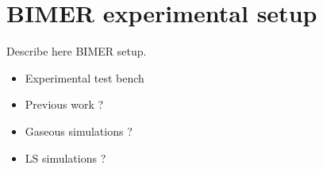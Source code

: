 \chapter{BIMER experimental setup}
	\label{ch:bimer_test_bench}


Describe here BIMER setup.

\begin{itemize}

	\item Experimental test bench
	
	\item Previous work ?
	
	\item Gaseous simulations ?
	
	\item LS simulations ?
		

\end{itemize}